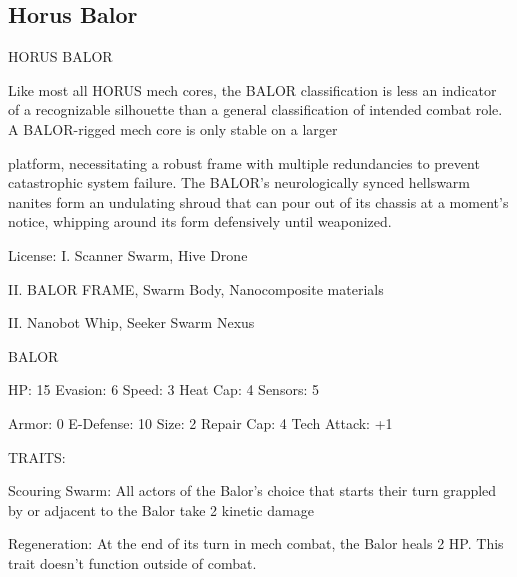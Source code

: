                                                                                                                      


                                                                                                                            
\subsection{Horus Balor}
                                                                                                                      


                                           HORUS BALOR  

Like most all HORUS mech cores, the BALOR classification is less an indicator of a recognizable silhouette  
than a general classification of intended combat role. A BALOR-rigged mech core is only stable on a larger  

platform, necessitating a robust frame with multiple redundancies to prevent catastrophic system failure.  
The BALOR’s neurologically synced hellswarm nanites form an undulating shroud that can pour out of its  
chassis at a moment’s notice, whipping around its form defensively until weaponized.  

                                                  License:  
I. Scanner Swarm, Hive Drone
 
II. BALOR FRAME, Swarm Body, Nanocomposite materials
 
II. Nanobot Whip, Seeker Swarm Nexus
 

                                                 BALOR 

 HP: 15         Evasion: 6                           Speed: 3           Heat Cap: 4       Sensors: 5 

 Armor: 0       E-Defense: 10                        Size: 2            Repair Cap: 4     Tech Attack:  
                                                                                          +1 

                                                  TRAITS: 

 Scouring Swarm: All actors of the Balor’s choice that starts their turn grappled by or adjacent to the  
 Balor take 2 kinetic damage
 
 Regeneration: At the end of its turn in mech combat, the Balor heals 2 HP. This trait doesn’t function  
 outside of combat. 

